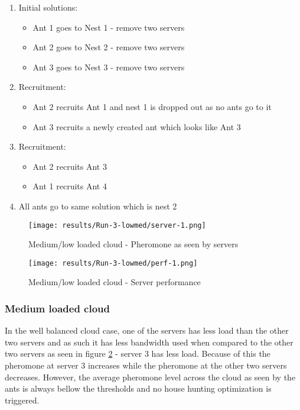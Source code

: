 \begin{enumerate}
	\item Initial solutions: 
	\begin{itemize}
		\item Ant 1 goes to Nest 1 - remove two servers
		\item Ant 2 goes to Nest 2 - remove two servers
		\item Ant 3 goes to Nest 3 - remove two servers
	\end{itemize}
	\item Recruitment:
	\begin{itemize}
		\item Ant 2 recruits Ant 1 and nest 1 is dropped out as no ants go to it
		\item Ant 3 recruits a newly created ant which looks like Ant 3
	\end{itemize}
	\item Recruitment:
	\begin{itemize}
		\item Ant 2 recruits Ant 3
		\item Ant 1 recruits Ant 4
	\end{itemize}
	\item All ants go to same solution which is nest 2
\end{enumerate}

\begin{figure}
	\centering
		\texttt{[image: results/Run-3-lowmed/server-1.png]}
	\caption{Medium/low loaded cloud - Pheromone as seen by servers}
	\label{fig:3serv-pher-lowmed}
\end{figure}

\begin{figure}
	\centering
		\texttt{[image: results/Run-3-lowmed/perf-1.png]}
	\caption{Medium/low loaded cloud - Server performance}
	\label{fig:3serv-perf-lowmed}
\end{figure}

\subsubsection{Medium loaded cloud}

In the well balanced cloud case, one of the servers has less load than the other two servers and as such it has less bandwidth used when compared to the other two servers as seen in figure \ref{fig:3serv-perf-lowmed} - server 3 has less load. Because of this the pheromone at server 3 increases while the pheromone at the other two servers decreases. However, the average pheromone level across the cloud as seen by the ants is always bellow the thresholds and no house hunting optimization is triggered.

